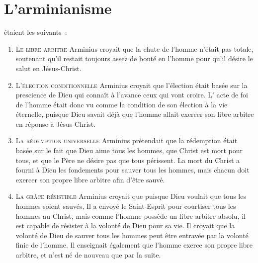 \section{L'arminianisme}

 étaient les suivants~:\\[.5ex]

\begin{enumerate}
  \item  \textsc{Le libre arbitre}
\nobreak
Arminius croyait que la chute de l'homme
  n'était pas totale,
 soutenant qu'il restait toujours assez de bonté en l'homme
 pour qu'il désire le salut en Jésus-Christ.

  \item  \textsc{L'élection conditionnelle}
\nobreak
Arminius croyait que l'élection était basée sur la prescience
 de Dieu qui connaît à l'avance ceux qui vont croire.
 L' \og acte de foi \fg de l'homme était donc vu comme la \og condition \fg{} 
 de son élection à la vie éternelle, puisque Dieu savait déjà
 que l'homme allait exercer son \og libre arbitre \fg{}
 en réponse à Jésus-Christ.

  \item  \textsc{La rédemption universelle}
\nobreak
Arminius prétendait que la rédemption était basée sur le fait
 que Dieu aime tous les hommes, que Christ est mort pour tous,
 et que le Père ne désire pas que tous périssent.
 La mort du Christ a fourni à Dieu les fondements
 pour sauver tous les hommes, mais chacun doit exercer son propre
 \og libre arbitre \fg{} afin d'être sauvé.

  \item  \textsc{La grâce résistible}
\nobreak
Arminius croyait que puisque Dieu voulait que tous les hommes soient sauvés,
 Il a envoyé le Saint-Esprit pour \og courtiser \fg{}
 tous les hommes au Christ,
 mais comme l'homme possède un \og libre-arbitre \fg{} absolu, il est capable de résister
 à la volonté de Dieu pour sa vie.
 Il croyait que la volonté de Dieu de sauver tous les hommes peut être
 entravée par la volonté finie de l'homme.
 Il enseignait également que l'homme exerce son propre libre arbitre,
 et n'est né de nouveau que par la suite.


\end{enumerate}
